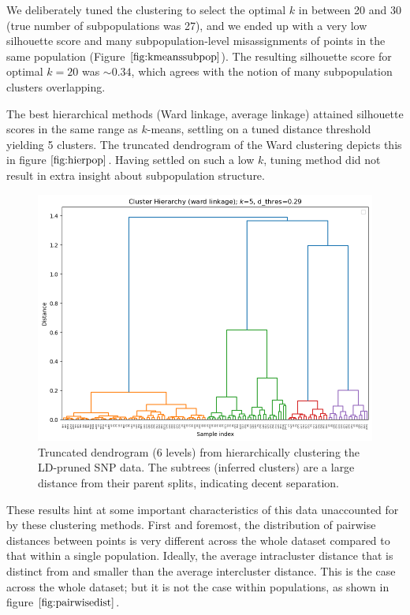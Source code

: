 \documentclass[11pt]{article}
\theoremstyle{definition}
\begin{document}
\noindent We deliberately tuned the clustering to select the optimal $k$ in between 20 and 30 (true number of subpopulations was 27), and we ended up with a very low silhouette score and many subpopulation-level misassignments of points in the same population (Figure $\ref{fig:kmeanssubpop}$). The resulting silhouette score for optimal $k=20$ was $\sim 0.34$, which agrees with the notion of many subpopulation clusters overlapping.

\noindent The best hierarchical methods (Ward linkage, average linkage) attained silhouette scores in the same range as $k$-means, settling on a tuned distance threshold yielding 5 clusters. The truncated dendrogram of the Ward clustering depicts this in figure $\ref{fig:hierpop}$. Having settled on such a low $k$, tuning method did not result in extra insight about subpopulation structure.

\begin{figure}
    \begin{center}
        \includegraphics[scale=0.5]{img/snp_clustering_report_47_1.png}
    \end{center}
    \caption{Truncated dendrogram (6 levels) from hierarchically clustering the LD-pruned SNP data. The subtrees (inferred clusters) are a large distance from their parent splits, indicating decent separation.}
    \label{fig:hierpop}
\end{figure}

\noindent These results hint at some important characteristics of this data unaccounted for by these clustering methods. First and foremost, the distribution of pairwise distances between points is very different across the whole dataset compared to that within a single population. Ideally, the average intracluster distance that is distinct from and smaller than the average intercluster distance. This is the case across the whole dataset; but it is not the case within populations, as shown in figure $\ref{fig:pairwisedist}$.
\end{document}
